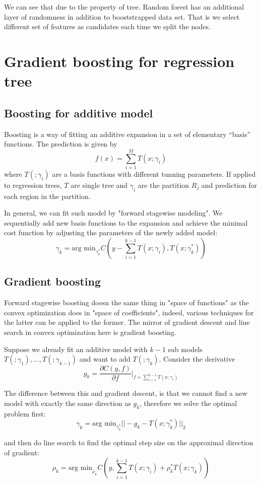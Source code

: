 \documentclass{article}
\begin{document}
We can see that due to the property of tree. Random forest has an additional layer of randomness in addition to booststrapped data set. That is we select different set of features as candidates each time we split the nodes.

\section{Gradient boosting for regression tree}
\subsection{Boosting for additive model}
Boosting is a way of fitting an additive expansion in a set of elementary “basis” functions. The prediction is given by
\[
f(x)=\sum_{i=1}^MT(x;\gamma_i)
\]
where $T(;\gamma_i)$ are a basis functions with different tunning parameters. If applied to regression trees, $T$ are single tree and $\gamma_i$ are the partition ${R_j}$ and prediction for each region in the partition.

In general, we can fit such model by "forward stagewise modeling". We sequentially add new basis functions to the expansion and achieve the minimal cost function by adjusting the parameters of the newly added model:
\[
\gamma_k=\textrm{arg min}_{\gamma_k^*}C(y-\sum_{i=1}^{k-1}T(x;\gamma_i),T(x;\gamma_k^*))
\]

\subsection{Gradient boosting}
Forward stagewise boosting doesn the same thing in "space of functions" as the convex optimization does in "space of coefficients", indeed, various techniques for the latter can be applied to the former. The mirror of gradient descent and line search in convex optimization here is gradient boosting.

Suppose we already fit an additive model with $k-1$ sub models $T(;\gamma_1), \dots, T(;\gamma_{k-1})$ and want to add $T(;\gamma_k)$. Consider the derivative
\[
g_k=\frac{\partial C(y,f)}{\partial f}|_{f=\sum_{i=1}^{k-1}T(x;\gamma_i)}
\]

The difference between this and gradient descent, is that we cannot find a new model with exactly the same direction as $g_k$, therefore we solve the optimal problem first:
\[
\gamma_k=\textrm{arg min}_{\gamma_k^*}||-g_k-T(x;\gamma_k^*)||_2
\]

and then do line search to find the optimal step size on the approximal direction of gradient:
\[
\rho_k=\textrm{arg min}_{\rho_k}C(y,\sum_{i=1}^{k-1}T(x;\gamma_i)+\rho_k^*T(x;\gamma_k))
\]
\end{document}

